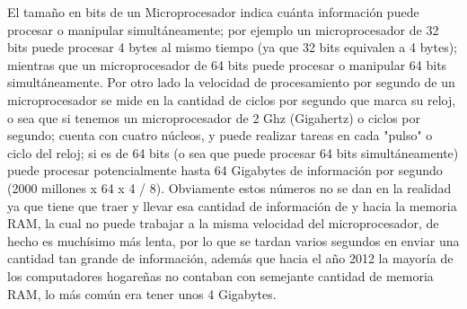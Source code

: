 \documentclass{article}
\begin{document}
El tamaño en bits de un Microprocesador indica cuánta información puede procesar o
manipular simultáneamente; por ejemplo un microprocesador de 32 bits puede procesar 4
bytes al mismo tiempo (ya que 32 bits equivalen a 4 bytes); mientras que un microprocesador
de 64 bits puede procesar o manipular 64 bits simultáneamente. Por otro lado la velocidad de
procesamiento por segundo de un microprocesador se mide en la cantidad de ciclos por
segundo que marca su reloj, o sea que si tenemos un microprocesador de 2 Ghz (Gigahertz) o
ciclos por segundo; cuenta con cuatro núcleos, y puede realizar tareas en cada "pulso" o ciclo
del reloj; si es de 64 bits (o sea que puede procesar 64 bits simultáneamente) puede procesar
potencialmente hasta 64 Gigabytes de información por segundo (2000 millones x 64 x 4 / 8).
Obviamente estos números no se dan en la realidad ya que tiene que traer y llevar esa cantidad
de información de y hacia la memoria RAM, la cual no puede trabajar a la misma velocidad del
microprocesador, de hecho es muchísimo más lenta, por lo que se tardan varios segundos en
enviar una cantidad tan grande de información, además que hacia el año 2012 la mayoría de los
computadores hogareñas no contaban con semejante cantidad de memoria RAM, lo más común
era tener unos 4 Gigabytes.
\end{document}
